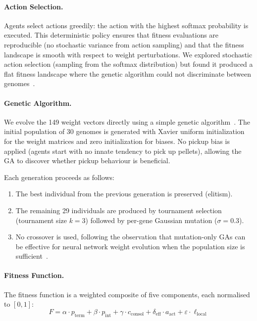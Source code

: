 \documentclass[11pt,a4paper]{article}
\begin{document}
\paragraph{Action Selection.}
Agents select actions greedily: the action with the highest softmax probability is executed. This deterministic policy ensures that fitness evaluations are reproducible (no stochastic variance from action sampling) and that the fitness landscape is smooth with respect to weight perturbations. We explored stochastic action selection (sampling from the softmax distribution) but found it produced a flat fitness landscape where the genetic algorithm could not discriminate between genomes~\cite{stanley2002}.

\paragraph{Genetic Algorithm.}
We evolve the 149 weight vectors directly using a simple genetic algorithm~\cite{holland1975}. The initial population of 30 genomes is generated with Xavier uniform initialization~\cite{glorot2010} for the weight matrices and zero initialization for biases. No pickup bias is applied (agents start with no innate tendency to pick up pellets), allowing the GA to discover whether pickup behaviour is beneficial.

Each generation proceeds as follows:
\begin{enumerate}
    \item The best individual from the previous generation is preserved (elitism).
    \item The remaining 29 individuals are produced by tournament selection (tournament size \(k\!=\!3\)) followed by per-gene Gaussian mutation (\(\sigma\!=\!0.3\)).
    \item No crossover is used, following the observation that mutation-only GAs can be effective for neural network weight evolution when the population size is sufficient~\cite{stanley2002}.
\end{enumerate}

\paragraph{Fitness Function.}
The fitness function is a weighted composite of five components, each normalised to \([0,1]\):
\[F = \alpha \cdot p_\text{term} + \beta \cdot p_\text{int} + \gamma \cdot c_\text{consol} + \delta_\text{eff} \cdot a_\text{act} + \varepsilon \cdot \ell_\text{local}\]
\end{document}
